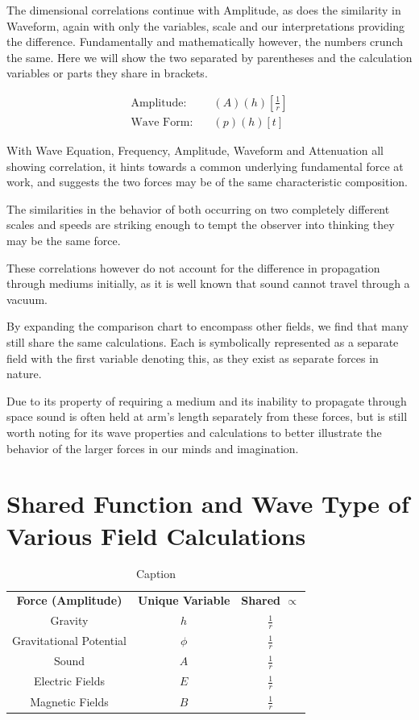 \documentclass[12pt]{article}
\begin{document}
The dimensional correlations continue with Amplitude, as does the similarity in Waveform, again with only the variables, scale and our interpretations providing the difference. Fundamentally and mathematically however, the numbers crunch the same. Here we will show the two separated by parentheses and the calculation variables or parts they share in brackets.

\begin{align*}
\text{Amplitude:} \quad & (A)(h) \left[\frac{1}{r}\right] \\
\text{Wave Form:} \quad & (p)(h)[t]
\end{align*}

With Wave Equation, Frequency, Amplitude, Waveform and Attenuation all showing correlation, it hints towards a common underlying fundamental force at work, and suggests the two forces may be of the same characteristic composition.

The similarities in the behavior of both occurring on two completely different scales and speeds are striking enough to tempt the observer into thinking they may be the same force.

These correlations however do not account for the difference in propagation through mediums initially, as it is well known that sound cannot travel through a vacuum.

By expanding the comparison chart to encompass other fields, we find that many still share the same calculations. Each is symbolically represented as a separate field with the first variable denoting this, as they exist as separate forces in nature.

Due to its property of requiring a medium and its inability to propagate through space sound is often held at arm's length separately from these forces, but is still worth noting for its wave properties and calculations to better illustrate the behavior of the larger forces in our minds and imagination.

\section*{Shared Function and Wave Type of Various Field Calculations}

\begin{table}
    \centering
    \begin{tabular}{ccc}
         \textbf{Force (Amplitude)} & \textbf{Unique Variable} & \textbf{Shared $\propto$} \\
Gravity & $h$ & $\frac{1}{r}$ \\
Gravitational Potential & $\phi$ & $\frac{1}{r}$ \\
Sound & $A$ & $\frac{1}{r}$ \\
Electric Fields & $E$ & $\frac{1}{r}$ \\
Magnetic Fields & $B$ & $\frac{1}{r}$
    \end{tabular}
    \caption{Caption}
    \label{tab:Table 1}
\end{table}
\end{document}
